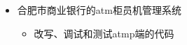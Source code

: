 \begin{itemize}
  \item 合肥市商业银行的atm柜员机管理系统
  \begin{itemize}
    \item 改写、调试和测试atmp端的代码
  \end{itemize}
\end{itemize}
